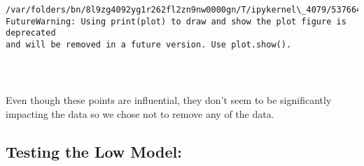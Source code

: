 \documentclass[11pt]{article}
\begin{document}
    \begin{Verbatim}[commandchars=\\\{\}]
/var/folders/bn/8l9zg4092yg1r262fl2zn9nw0000gn/T/ipykernel\_4079/5376649.py:17:
FutureWarning: Using print(plot) to draw and show the plot figure is deprecated
and will be removed in a future version. Use plot.show().
    \end{Verbatim}

    \begin{center}
    \end{center}
    { \hspace*{\fill} \\}
    
    \begin{Verbatim}[commandchars=\\\{\}]

    \end{Verbatim}

    Even though these points are influential, they don't seem to be
significantly impacting the data so we chose not to remove any of the
data.

    \subsection{Testing the Low Model:}\label{testing-the-low-model}
\end{document}
